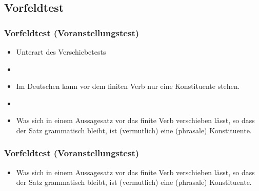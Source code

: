 \subsection{Vorfeldtest}


\begin{frame}
\frametitle{Vorfeldtest (Voranstellungstest)}

\begin{itemize}
	\item Unterart des Verschiebetests
	\item[]
	\item Im Deutschen kann vor dem finiten Verb nur eine Konstituente stehen. 
	\item[]
	\item Was sich in einem Aussagesatz vor das finite Verb verschieben lässt, so dass der Satz grammatisch bleibt, ist (vermutlich) eine (phrasale) Konstituente.

\end{itemize}

\end{frame}


\begin{frame}
\frametitle{Vorfeldtest (Voranstellungstest)}

\begin{itemize}
	\item Was sich in einem Aussagesatz vor das finite Verb verschieben lässt, so dass der Satz grammatisch bleibt, ist (vermutlich) eine (phrasale) Konstituente.

	\eal
	\zl

\end{itemize}

\end{frame}


